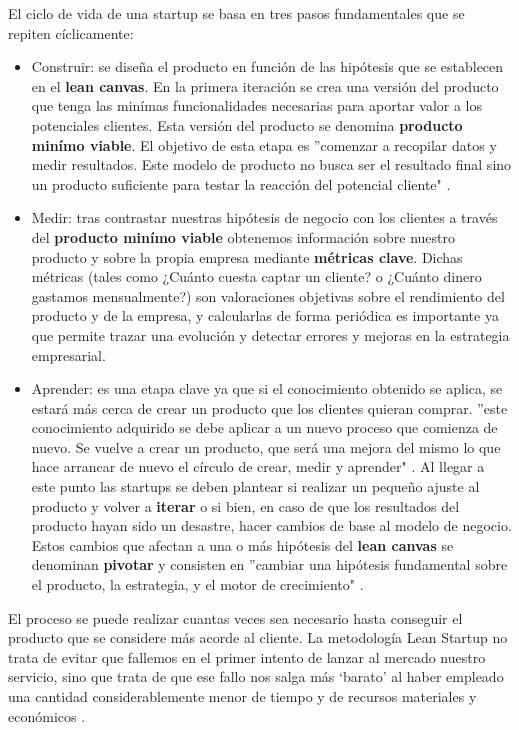 El ciclo de vida de una startup se basa en tres pasos fundamentales que se repiten cíclicamente:
\begin{itemize}
	\item Construir: se diseña el producto en función de las hipótesis que se establecen en el \textbf{lean canvas}. En la primera iteración se crea una versión del producto que tenga las minímas funcionalidades necesarias para aportar valor a los potenciales clientes. Esta versión del producto se denomina \textbf{producto minímo viable}. El objetivo de esta etapa es ''comenzar a recopilar datos y medir resultados. Este modelo de producto no busca ser el resultado final sino un producto suficiente para testar la reacción del potencial cliente" \cite{antevenio2016}.
	\item Medir: tras contrastar nuestras hipótesis de negocio con los clientes a través del \textbf{producto minímo viable} obtenemos información sobre nuestro producto y sobre la propia empresa mediante \textbf{métricas clave}. Dichas métricas (tales como ¿Cuánto cuesta captar un cliente? o ¿Cuánto dinero gastamos mensualmente?) son valoraciones objetivas sobre el rendimiento del producto y de la empresa, y calcularlas de forma periódica es importante ya que permite trazar una evolución y detectar errores y mejoras en la estrategia empresarial.
	\item Aprender: es una etapa clave ya que si el conocimiento obtenido se aplica, se estará más cerca de crear un producto que los clientes quieran comprar. ''este conocimiento adquirido se debe aplicar a un nuevo proceso que comienza de nuevo. Se vuelve a crear un producto, que será una mejora del mismo lo que hace arrancar de nuevo el círculo de crear, medir y aprender" \cite{antevenio2016}. Al llegar a este punto las startups se deben plantear si realizar un pequeño ajuste al producto y volver a \textbf{iterar} o si bien, en caso de que los resultados del producto hayan sido un desastre, hacer cambios de base al modelo de negocio. Estos cambios que afectan a una o más hipótesis del \textbf{lean canvas} se denominan \textbf{pivotar} y consisten en ''cambiar una hipótesis fundamental sobre el producto, la estrategia, y el motor de crecimiento" \cite{emooc}.
\end{itemize}

El proceso se puede realizar cuantas veces sea necesario hasta conseguir el producto que se considere más acorde al cliente. La metodología Lean Startup no trata de evitar que fallemos en el primer intento de lanzar al mercado nuestro servicio, sino que trata de que ese fallo nos salga más ‘barato’ al haber empleado una cantidad considerablemente menor de tiempo y de recursos materiales y económicos \cite{andreapelaez} .

